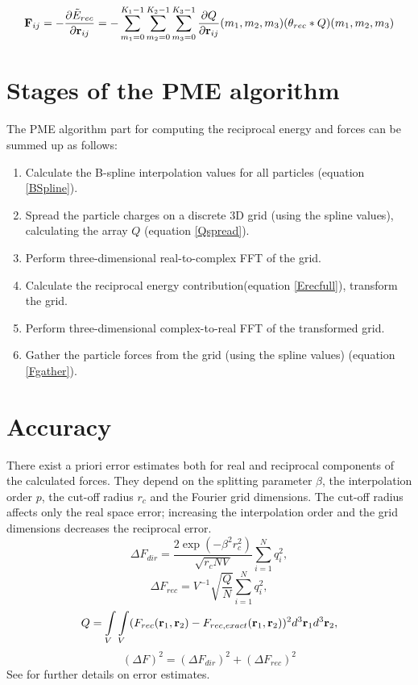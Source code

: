\documentclass[12pt,a4paper,notitlepage]{report}
\begin{document}
\begin{equation}  \label{Fgather}
\bold{F}_{ij}=-\frac{\partial\tilde{E}_{rec}}{\partial\bold{r}_{ij}} = -\sum\limits_{m_1 = 0}^{K_1 -1}\sum\limits_{m_2 = 0}^{K_2 -1}\sum\limits_{m_3 = 0}^{K_3 -1}\frac{\partial Q}{\partial\bold{r}_{ij}}(m_1, m_2, m_3)(\theta_{rec} \ast Q)(m_1, m_2, m_3)
\end{equation}



\section{Stages of the PME algorithm}

The PME algorithm part for computing the reciprocal energy and forces can be summed up as follows:

\begin{enumerate}
\item Calculate the B-spline interpolation values for all particles (equation \eqref{BSpline}).
\item Spread the particle charges on a discrete 3D grid (using the spline values), calculating the array $Q$ (equation \eqref{Qspread}).
\item Perform three-dimensional real-to-complex FFT of the grid.
\item Calculate the reciprocal energy contribution(equation \eqref{Erecfull}), transform the grid.
\item Perform three-dimensional complex-to-real FFT of the transformed grid.
\item Gather the particle forces from the grid (using the spline values) (equation \eqref{Fgather}).
\end{enumerate}

\section{Accuracy} \label{sec_ewald}
There exist a priori error estimates both for real and reciprocal components of the calculated forces. They depend on the splitting parameter $\beta$, the interpolation order $p$, the cut-off radius $r_c$ and the Fourier grid dimensions. The cut-off radius affects only the real space error; increasing the interpolation order and the grid dimensions decreases the reciprocal error. 
\[\Delta F_{dir}= \frac{2 \exp(-\beta^2 r_c^2)}{\sqrt{r_c N V}} \sum\limits_{i=1}^Nq_i^2,\]
\[\Delta F_{rec}= V^{-1}\sqrt{\frac{Q}{N}} \sum\limits_{i=1}^Nq_i^2,\]
\[Q = \int\limits_{V}\int\limits_{V} (F_{rec}(\bold{r}_1, \bold{r}_2)-F_{rec,exact}(\bold{r}_1, \bold{r}_2))^2 d^3 \bold{r}_1 d^3 \bold{r}_2,\]
\[(\Delta F)^2 = (\Delta F_{dir} )^2 + (\Delta F_{rec} )^2\]
See \cite{errors} for further details on error estimates.
\end{document}
